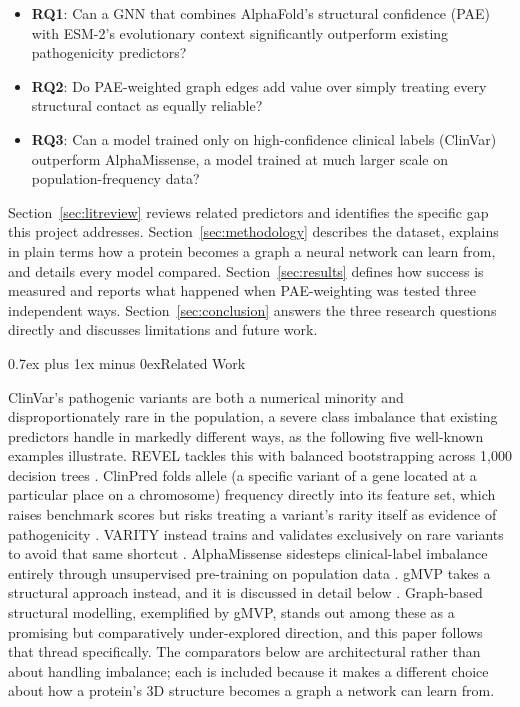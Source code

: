 \documentclass[10pt,conference,a4paper]{IEEEtran}
\makeatletter
\def\section{\@startsection{section}{1}{\z@}{1.5ex plus 1.5ex minus 0.5ex}%
{0.7ex plus 1ex minus 0ex}{\normalfont\normalsize\bfseries\centering}}%
\makeatother
\begin{document}
\begin{itemize}
\item \textbf{RQ1}: Can a GNN that combines AlphaFold's structural confidence (PAE) with ESM-2's evolutionary context significantly outperform existing pathogenicity predictors?
\item \textbf{RQ2}: Do PAE-weighted graph edges add value over simply treating every structural contact as equally reliable?
\item \textbf{RQ3}: Can a model trained only on high-confidence clinical labels (ClinVar) outperform AlphaMissense, a model trained at much larger scale on population-frequency data?
\end{itemize}

Section~\ref{sec:litreview} reviews related predictors and identifies the specific gap this project addresses. Section~\ref{sec:methodology} describes the dataset, explains in plain terms how a protein becomes a graph a neural network can learn from, and details every model compared. Section~\ref{sec:results} defines how success is measured and reports what happened when PAE-weighting was tested three independent ways. Section~\ref{sec:conclusion} answers the three research questions directly and discusses limitations and future work.

\section{Related Work}
\label{sec:litreview}

ClinVar's pathogenic variants are both a numerical minority and disproportionately rare in the population, a severe class imbalance that existing predictors handle in markedly different ways, as the following five well-known examples illustrate. REVEL tackles this with balanced bootstrapping across 1{,}000 decision trees \cite{ioannidis2016revel}. ClinPred folds allele (a specific variant of a gene located at a particular place on a chromosome) frequency directly into its feature set, which raises benchmark scores but risks treating a variant's rarity itself as evidence of pathogenicity \cite{alirezaie2018clinpred}. VARITY instead trains and validates exclusively on rare variants to avoid that same shortcut \cite{wu2021varity}. AlphaMissense sidesteps clinical-label imbalance entirely through unsupervised pre-training on population data \cite{cheng2023alphamissense}. gMVP takes a structural approach instead, and it is discussed in detail below \cite{zhang2022gmvp}. Graph-based structural modelling, exemplified by gMVP, stands out among these as a promising but comparatively under-explored direction, and this paper follows that thread specifically. The comparators below are architectural rather than about handling imbalance; each is included because it makes a different choice about how a protein's 3D structure becomes a graph a network can learn from.
\end{document}
